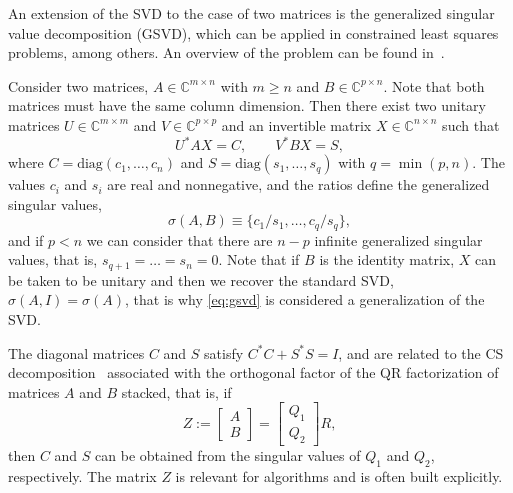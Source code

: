 An extension of the SVD to the case of two matrices is the generalized singular value decomposition (GSVD), which can be applied in constrained least squares problems, among others. An overview of the problem can be found in~\citep[\S 8.7.3]{Golub:1996:MC}.

Consider two matrices, $A\in\mathbb{C}^{m\times n}$ with $m\geq n$ and $B\in\mathbb{C}^{p\times n}$. Note that both matrices must have the same column dimension. Then there exist two unitary matrices $U\in\mathbb{C}^{m\times m}$ and $V\in\mathbb{C}^{p\times p}$ and an invertible matrix $X\in\mathbb{C}^{n\times n}$ such that
\begin{equation}
\label{eq:gsvd}
U^*AX=C,\qquad V^*BX=S,
\end{equation}
where $C=\mathrm{diag}(c_1,\dots,c_n)$ and $S=\mathrm{diag}(s_1,\dots,s_q)$ with $q=\min(p,n)$. The values $c_i$ and $s_i$ are real and nonnegative, and the ratios define the generalized singular values,
\begin{equation}
\label{eq:gsvd-values}
\sigma(A,B)\equiv\{c_1/s_1,\dots,c_q/s_q\},
\end{equation}
and if $p<n$ we can consider that there are $n-p$ infinite generalized singular values, that is, $s_{q+1}=\dots=s_n=0$. Note that if $B$ is the identity matrix, $X$ can be taken to be unitary and then we recover the standard SVD, $\sigma(A,I)=\sigma(A)$, that is why \eqref{eq:gsvd} is considered a generalization of the SVD.

The diagonal matrices $C$ and $S$ satisfy $C^*C+S^*S=I$, and are related to the CS decomposition~\citep[\S 2.6.4]{Golub:1996:MC} associated with the orthogonal factor of the QR factorization of matrices $A$ and $B$ stacked, that is, if
\begin{equation}
\label{eq:cs}
Z:=\begin{bmatrix}A\\B\end{bmatrix}=\begin{bmatrix}Q_1\\Q_2\end{bmatrix}R,
\end{equation}
then $C$ and $S$ can be obtained from the singular values of $Q_1$ and $Q_2$, respectively. The matrix $Z$ is relevant for algorithms and is often built explicitly.

